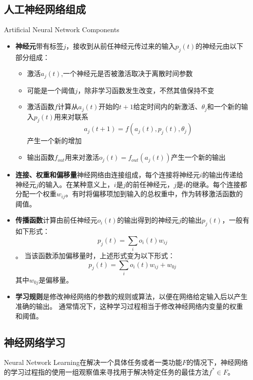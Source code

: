 \subsection{人工神经网络组成}{Artificial Neural Network Components}\cite{ wiki:Artificial_neural_network}
\begin{itemize}
  \item \textbf{神经元}带有标签$j$，接收到从前任神经元传过来的输入$ p_j(t)$的神经元由以下部分组成：
  \begin{itemize}
    \item 激活$a_j(t)$,一个神经元是否被激活取决于离散时间参数
    \item 可能是一个阈值$j$，除非学习函数发生改变，不然其值保持不变
    \item 激活函数$f$计算从$a_j(t)$开始的$t+1$给定时间内的新激活、$\theta_j$和一个新的输入$p_j(t)$用来对联系\begin{equation}a_{j}(t+1)=f\left(a_{j}(t), p_{j}(t), \theta_{j}\right)\end{equation}产生一个新的增加
    \item 输出函数$f_{out}$用来对激活$o_{j}(t)=f_{o u t}\left(a_{j}(t)\right)$产生一个新的输出
  \end{itemize}
  \item \textbf{连接、权重和偏移量}神经网络由连接组成，每个连接将神经元$i$的输出传递给神经元$j$的输入。在某种意义上，$i$是$j$的前任神经元，$j$是$i$的继承。每个连接都分配一个权重$w_{ij}$。有时将偏移项加到输入的总权重中，作为转移激活函数的阈值。
  \item \textbf{传播函数}计算由前任神经元$o_i(t)$的输出得到的神经元$j$的输出$p_j(t)$，一般有如下形式：
  \begin{equation}
    p_{j}(t)=\sum_{i} o_{i}(t) w_{i j}
  \end{equation}。
  当该函数添加偏移量时，上述形式变为以下形式：
  \begin{equation}
    p_{j}(t)=\sum_{i} o_{i}(t) w_{i j}+w_{0 j}
  \end{equation}其中$w_{0 j}$是偏移量。
  \item \textbf{学习规则}是修改神经网络的参数的规则或算法，以便在网络给定输入后以产生准确的输出。 通常情况下，这种学习过程相当于修改神经网络内变量的权重和阈值。
\end{itemize}

\subsection{神经网络学习}{Neural Network Learning}\cite{ wiki:Artificial_neural_network}在解决一个具体任务或者一类功能$F$的情况下，神经网络的学习过程指的使用一组观察值来寻找用于解决特定任务的最佳方法$f^{*} \in F$。


